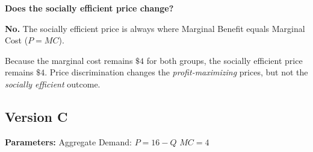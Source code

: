 \documentclass[12pt]{article}
\begin{document}
\begin{subqs}
\item \textbf{Does the socially efficient price change?}
  \begin{solbullets}
    \item \textbf{No.} The socially efficient price is always where Marginal Benefit equals Marginal Cost ($P = MC$).
    \item Because the marginal cost remains $\$4$ for both groups, the socially efficient price remains $\$4$. Price discrimination changes the \textit{profit-maximizing} prices, but not the \textit{socially efficient} outcome.
  \end{solbullets}

\end{subqs}

\newpage

\subsection*{Version C}

\textbf{Parameters:} Aggregate Demand: $P = 16 - Q$ \textbar{} $MC = 4$
\end{document}
